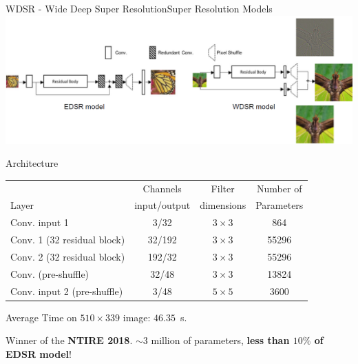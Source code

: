 \documentclass[10pt, unicode]{beamer}
\begin{document}
\begin{frame}{WDSR - Wide Deep Super Resolution}{Super Resolution Models}
  \centering
  \includegraphics[width=0.7\linewidth]{images/SR_models.png}


  \begin{block}{Architecture}
    \scriptsize{
    \begin{tabular}{lccc}
      \hline \rowcolor{blue}
                                  &  Channels     & Filter     & Number of    \\
      \rowcolor{blue}
      Layer                       & input/output  & dimensions & Parameters   \\
      \hline
      Conv. input 1               & 3/32       & $3\times3$   & 864     \\
      Conv. 1 (32 residual block)    & 32/192     & $3\times3$   & 55296   \\
      Conv. 2 (32 residual block)    & 192/32     & $3\times3$   & 55296   \\
      Conv. (pre-shuffle)         & 32/48      & $3\times3$   & 13824   \\
      Conv. input 2 (pre-shuffle) & 3/48       & $5\times5$   & 3600    \\
      \hline
    \end{tabular}
    }

    \vspace{0.5cm}
    \scriptsize{Average Time on $510\times339$ image: $46.35$~s.}

    \scriptsize{Winner of the \textbf{NTIRE 2018}. $\sim3$ million of parameters, \textbf{less than $10\%$ of EDSR model}!}
  \end{block}

\end{frame}
\end{document}
